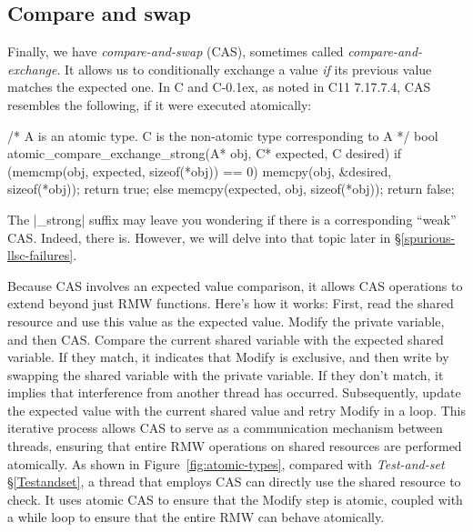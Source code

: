 \documentclass[fontsize=10pt, oneside]{scrartcl}
\newcommand{\cplusplus}[1]{C\kern-0.1ex\raisebox{0.15ex}{\texttt{++}}}
\newcommand{\clang}[1]{C}
\newcommand{\fig}[1]{Figure~\ref{#1}}
\newcommand{\introduce}[1]{\textit{#1}}
\newcommand{\secref}[1]{\hyperref[#1]{\textsc{\S}\ref*{#1}}}
\begin{document}
\subsection{Compare and swap}
\label{cas}
Finally, we have \introduce{compare-and-swap} (\textsc{CAS}),
sometimes called \introduce{compare-and-exchange}.
It allows us to conditionally exchange a value \emph{if} its previous value matches the expected one.
In \clang{} and \cplusplus{}, as noted in C11 7.17.7.4, \textsc{CAS} resembles the following,
if it were executed atomically:
\begin{ccode}
/* A is an atomic type. C is the non-atomic type corresponding to A */
bool atomic_compare_exchange_strong(A* obj, C* expected, C desired)
{
    if (memcmp(obj, expected, sizeof(*obj)) == 0) {
        memcpy(obj, &desired, sizeof(*obj));
        return true;
    } else {
        memcpy(expected, obj, sizeof(*obj));
        return false;
    }
}
\end{ccode}

\begin{samepage}
\noindent The \cpp|_strong| suffix may leave you wondering if there is a corresponding ``weak'' \textsc{CAS}.
Indeed, there is. However, we will delve into that topic later in \secref{spurious-llsc-failures}.
\end{samepage}

Because \textsc{CAS} involves an expected value comparison, 
it allows \textsc{CAS} operations to extend beyond just \textsc{RMW} functions. 
Here's how it works: First, read the shared resource and use this value as the expected value. 
Modify the private variable, and then \textsc{CAS}. Compare the current shared variable with the expected shared variable. 
If they match, it indicates that Modify is exclusive, and then write by swapping the shared variable with the private variable.
If they don't match, it implies that interference from another thread has occurred.
Subsequently, update the expected value with the current shared value and retry Modify in a loop.
This iterative process allows \textsc{CAS} to serve as a communication mechanism between threads, 
ensuring that entire \textsc{RMW} operations on shared resources are performed atomically.
As shown in \fig{fig:atomic-types}, compared with \introduce{Test-and-set} \secref{Testandset}, 
a thread that employs \textsc{CAS} can directly use the shared resource to check.
It uses atomic \textsc{CAS} to ensure that the Modify step is atomic,
coupled with a while loop to ensure that the entire \textsc{RMW} can behave atomically.
\end{document}

